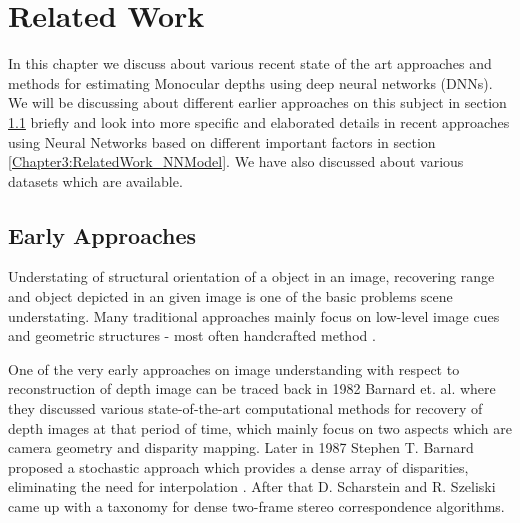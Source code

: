 
\chapter{Related Work} %

\label{Chapter3:RelatedWork} %

In this chapter we discuss about various recent state of the art approaches and methods for estimating Monocular depths using deep neural networks (DNNs). We will be discussing about different earlier approaches on this subject in section \ref{Chapter3:RelatedWork_EarlyApproach} briefly and look into more specific and elaborated details in recent approaches using Neural Networks based on different important factors in section \ref{Chapter3:RelatedWork_NNModel}. We have also discussed about various datasets which are available. 

\section{Early Approaches}
\label{Chapter3:RelatedWork_EarlyApproach}
Understating of structural orientation of a object in an image, recovering range and object depicted in an given image is one of the basic problems scene understating. Many traditional approaches mainly focus on low-level image cues and geometric structures - most often handcrafted method \cite{torralba2002depth, pentland1987new,lai1992generalized,saxena2006learning}.
 
One of the very early approaches on image understanding with respect to reconstruction of depth image can be traced back in 1982 Barnard et. al. \cite{barnard1982computational} where they discussed various state-of-the-art computational methods for recovery of depth images at that period of time, which mainly focus on two aspects which are camera geometry and disparity mapping. Later in 1987 Stephen T. Barnard proposed a stochastic approach which provides a dense array of disparities, eliminating the need for interpolation \cite{barnard1987stochastic}. After that D. Scharstein and R. Szeliski \cite{scharstein2002taxonomy} came up with a taxonomy for dense two-frame stereo correspondence algorithms.\\

